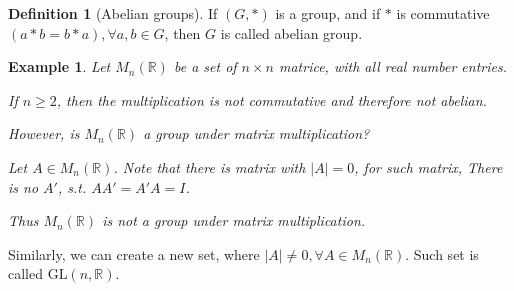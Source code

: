 \documentclass{article}
\theoremstyle{MyNonumberplain}
\theoremstyle{break}
\theoremstyle{break}
\newtheorem{example}{Example}[section]
\theoremstyle{break}
\theoremstyle{definition}
\theoremstyle{break}
\newtheorem{definition}{Definition}[section]
\begin{document}
\begin{defbox}
    \begin{definition}[Abelian groups]
        If $(G, \ast)$ is a group, and if $\ast$ is commutative $(a \ast b = b \ast a), \forall a, b \in G$, then $G$ is called abelian group.
    \end{definition}
\end{defbox}


\begin{expbox}
    \begin{example}
        Let $M_n (\mathbb{R})$ be a set of $n \times n$ matrice, with all real number entries.\bigskip

        If $n \geq 2$, then the multiplication is not commutative and therefore not abelian.\bigskip

        However, is $M_n (\mathbb{R})$ a group under matrix multiplication?

        \begin{ansbox}
            Let $A \in M_n (\mathbb{R})$. Note that there is matrix with $| A | = 0$, for such matrix, There is no
            $A'$, s.t. $A A' = A' A = I$.\bigskip
    
            Thus $M_n (\mathbb{R})$ is not a group under matrix multiplication.    
        \end{ansbox}

    
    \end{example}
\end{expbox}

Similarly, we can create a new set, where $| A | \neq 0, \forall A \in M_n
(\mathbb{R})$. Such set is called $\text{GL} (n, \mathbb{R})$.
\end{document}
